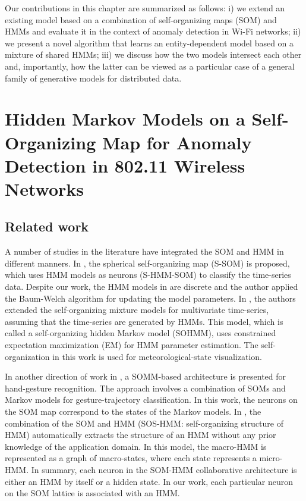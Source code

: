 Our contributions in this chapter are summarized as follows: i) we extend an existing model based on a combination of self-organizing maps (SOM) and HMMs and evaluate it in the context of anomaly detection in Wi-Fi networks; ii) we present a novel algorithm that learns an entity-dependent model based on a mixture of shared HMMs; iii) we discuss how the two models intersect each other and, importantly, how the latter can be viewed as a particular case of a general family of generative models for distributed data.

\section{Hidden Markov Models on a Self-Organizing Map for Anomaly Detection in 802.11 Wireless Networks}
\label{sec:sohmmm}

\subsection{Related work}
A number of studies in the literature have integrated the SOM and HMM in different manners. In \citet{Gen2012}, the spherical self-organizing map (S-SOM) is proposed, which uses HMM models as neurons (S-HMM-SOM) to classify the time-series data. Despite our work, the HMM models in \citet{Gen2012} are discrete and the author applied the  Baum-Welch algorithm for updating the model parameters. In \citet{Yamaguchi2010}, the authors extended the self-organizing mixture models for multivariate time-series, assuming that the time-series are generated by HMMs. This model, which is called a self-organizing hidden Markov model (SOHMM), uses constrained expectation maximization (EM) for HMM parameter estimation. The self-organization in this work is used for meteorological-state visualization. 

In another direction of work in \citet{Caridakis2010}, a SOMM-based architecture is presented for hand-gesture recognition. The approach involves a combination of SOMs and Markov models for gesture-trajectory classification. In this work, the neurons on the SOM map correspond to the states of the Markov models. In \citet{Jaziri2011}, the combination of the SOM and HMM (SOS-HMM: self-organizing structure of HMM) automatically extracts the structure of an HMM without any prior knowledge of the application domain. In this model, the macro-HMM is represented as a graph of macro-states, where each state represents a micro-HMM. In summary, each neuron in the SOM-HMM collaborative architecture is either an HMM by itself or a hidden state. In our work, each particular neuron on the SOM lattice is associated with an HMM. 

